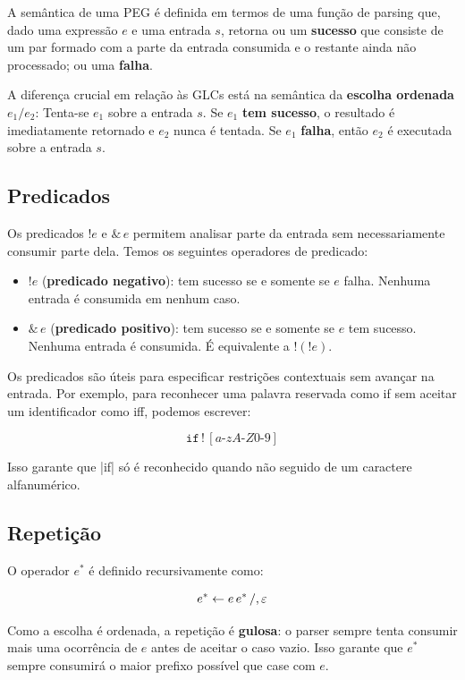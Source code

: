 A semântica de uma PEG é definida em termos de uma função de parsing
que, dado uma expressão \(e\) e uma entrada \(s\), retorna ou um
\textbf{sucesso} que consiste de um par formado com a parte da
entrada consumida e o restante ainda não processado; ou uma \textbf{falha}.

A diferença crucial em relação às GLCs está na semântica da
\textbf{escolha ordenada} \(e_1 / e_2\):
Tenta-se \(e_1\) sobre a entrada \(s\). Se \(e_1\) \textbf{tem
sucesso}, o resultado é imediatamente retornado e \(e_2\) nunca é
tentada. Se \(e_1\) \textbf{falha}, então \(e_2\) é executada sobre
a entrada \(s\).

\subsection{Predicados}

Os predicados \(!e\) e \(\&\,e\) permitem analisar parte da entrada
sem necessariamente consumir parte dela. Temos os seguintes
operadores de predicado:

\begin{itemize}
  \item
    \(!e\) (\textbf{predicado negativo}): tem sucesso se e somente se
    \(e\) falha. Nenhuma entrada é consumida em nenhum caso.
  \item
    \(\&\,e\) (\textbf{predicado positivo}): tem sucesso se e somente
    se \(e\) tem sucesso. Nenhuma entrada é consumida. É equivalente
    a \(!(!e)\).
\end{itemize}

Os predicados são úteis para especificar restrições contextuais sem
avançar na entrada. Por exemplo, para reconhecer uma palavra
reservada como if sem aceitar um
identificador como iff, podemos escrever:

\[
  \texttt{if}\, !\,[a\text{-}zA\text{-}Z0\text{-}9]
\]

Isso garante que \haskell|if| só é reconhecido quando
não seguido de um caractere alfanumérico.

\subsection{Repetição}

O operador \(e^*\) é definido recursivamente como:

\[
  e^* \leftarrow e\, e^* \,/\\, \varepsilon
\]

Como a escolha é ordenada, a repetição é \textbf{gulosa}: o parser
sempre tenta consumir mais uma ocorrência de \(e\) antes de aceitar o
caso vazio. Isso garante que \(e^*\) sempre consumirá o maior prefixo
possível que case com \(e\).


